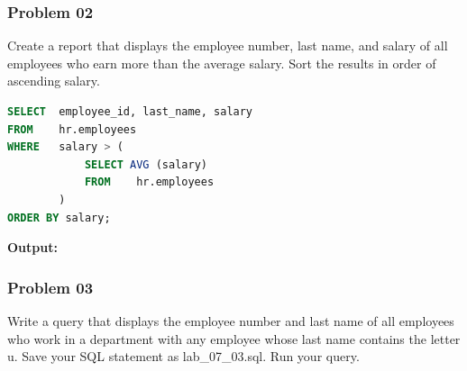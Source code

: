 \newpage
\subsubsection*{Problem 02}
Create a report that displays the employee number, last name, and salary of all employees who earn more than the average salary. Sort the results in order of ascending salary.

\begin{frame}



\begin{lstlisting}[language=SQL]
SELECT 	employee_id, last_name, salary
FROM 	hr.employees
WHERE 	salary > (
   			SELECT AVG (salary)
   			FROM 	hr.employees
		)
ORDER BY salary;
\end{lstlisting}
\textbf{Output: }
\end{frame}




\vspace{5cm}
\subsubsection*{Problem 03}
Write a query that displays the employee number and last name of all employees who work in a department with any employee whose last name contains the letter u. Save your SQL statement as lab\_07\_03.sql. Run your query.

